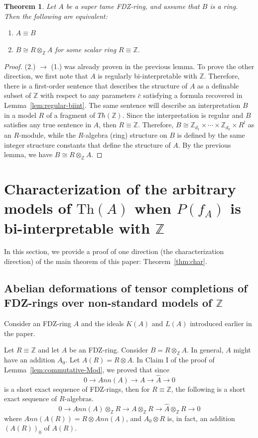 \documentclass{article}
\newtheorem{theorem}{Theorem}[section]
\theoremstyle{remark}
\newcommand{\Th}{\textrm{Th}}
\def\Z{{\mathbb{Z}}}
\def\barA{\hat{A}}
\begin{document}
\begin{theorem} Let $A$ be a super tame FDZ-ring, and assume that $B$ is a ring. Then the following are equivalent:
\begin{enumerate}
    \item $A\equiv B$
    \item $B\cong R\otimes_{\Z}A$ for some scalar ring $R\equiv \Z$.   
    \end{enumerate}
\end{theorem}
\begin{proof} (2.) $\to$ (1.) was already proven in the previous lemma. To prove the other direction, we first note that $A$ is regularly bi-interpretable with $\Z$. Therefore, there is a first-order sentence that describes the structure of $A$ as a definable subset of $\Z$ with respect to any parameters $\bar{c}$ satisfying a formula recovered in Lemma~\ref{lem:regular-biint}. The same sentence will describe an interpretation $B$ in a model $R$ of a fragment of $Th(\Z)$. Since the interpretation is regular and $B$ satisfies any true sentence in $A$, then $R\equiv \Z$. Therefore, $B\cong \Z_{d_1}\times \cdots \times \Z_{d_k}\times R^l$ as an $R$-module, while the $R$-algebra (ring) structure on $B$ is defined by the same integer structure constants that define the structure of $A$. By the previous lemma, we have $B\cong R\otimes_{\Z} A$.
    
\end{proof}

\section{Characterization of the arbitrary models of \texorpdfstring{$\Th(A)$}{Th(A)} when \texorpdfstring{$P(f_A)$}{P(fA)} is bi-interpretable with \texorpdfstring{$\Z$}{Z}}\label{sec:charac} 
In this section, we provide a proof of one direction (the characterization direction) of the main theorem of this paper: Theorem~\ref{thm:char}. 
\subsection{Abelian deformations of tensor completions of FDZ-rings over non-standard models of \texorpdfstring{$\Z$}{Z}}
Consider an FDZ-ring $A$ and the ideals $K(A)$ and $L(A)$ introduced earlier in the paper.

Let $R\equiv \Z$ and let $A$ be an FDZ-ring. Consider $B=R\otimes_\Z A$. In general, $A$ might have an addition $A_0$. Let $A(R)=R\otimes A$. In Claim I of the proof of Lemma~\ref{lem:commutative-Mod}, we proved that since
$$0\to Ann(A) \to A \to \barA\to 0$$ is a short exact sequence of FDZ-rings, then for $R\equiv \Z$, the following is a short exact sequence of $R$-algebras.
$$0\to Ann(A)\otimes_\Z R \to A\otimes_\Z R \to \barA\otimes_\Z R\to 0$$ 
where $Ann(A(R))=R\otimes Ann(A)$, and $A_0\otimes R$ is, in fact, an addition $(A(R))_0$ of $A(R)$. 
\end{document}
